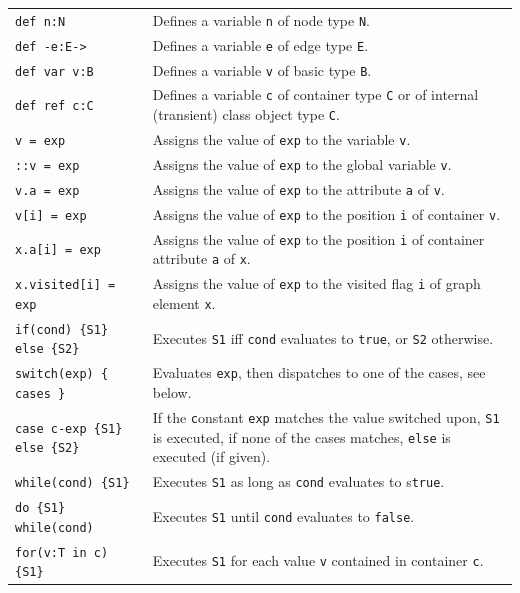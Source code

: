 \begin{table}[htbp]
\begin{minipage}{\linewidth} \renewcommand{\footnoterule}{} 
\begin{tabularx}{\linewidth}{|lX|}
\hline
\texttt{def n:N}	& Defines a variable \texttt{n} of node type \texttt{N}.\\
\texttt{def -e:E->}	& Defines a variable \texttt{e} of edge type \texttt{E}.\\
\texttt{def var v:B}	& Defines a variable \texttt{v} of basic type \texttt{B}.\\
\texttt{def ref c:C}	& Defines a variable \texttt{c} of container type \texttt{C} or of internal (transient) class object type \texttt{C}.\\
\hline
\texttt{v = exp} & Assigns the value of \texttt{exp} to the variable \texttt{v}.\\
\texttt{::v = exp} & Assigns the value of \texttt{exp} to the global variable \texttt{v}.\\
\texttt{v.a = exp} & Assigns the value of \texttt{exp} to the attribute \texttt{a} of \texttt{v}.\\
\texttt{v[i] = exp} & Assigns the value of \texttt{exp} to the position \texttt{i} of container \texttt{v}.\\
\texttt{x.a[i] = exp} & Assigns the value of \texttt{exp} to the position \texttt{i} of container attribute \texttt{a} of \texttt{x}.\\
\texttt{x.visited[i] = exp} & Assigns the value of \texttt{exp} to the visited flag \texttt{i} of graph element \texttt{x}.\\
\hline
\texttt{if(cond) \{S1\} else \{S2\}} & Executes \texttt{S1} iff \texttt{cond} evaluates to \texttt{true}, or \texttt{S2} otherwise.\\
\texttt{switch(exp) \{ cases \}} & Evaluates \texttt{exp}, then dispatches to one of the cases, see below.\\
\texttt{case c-exp \{S1\} else \{S2\}} & If the \texttt{c}onstant \texttt{exp} matches the value switched upon, \texttt{S1} is executed, if none of the cases matches, \texttt{else} is executed (if given).\\
\texttt{while(cond) \{S1\} } & Executes \texttt{S1} as long as \texttt{cond} evaluates to s\texttt{true}.\\
\texttt{do \{S1\} while(cond) } & Executes \texttt{S1} until \texttt{cond} evaluates to \texttt{false}.\\
\texttt{for(v:T in c) \{S1\} } & Executes \texttt{S1} for each value \texttt{v} contained in container \texttt{c}.\\

\end{tabularx}
\end{minipage}
\end{table}
